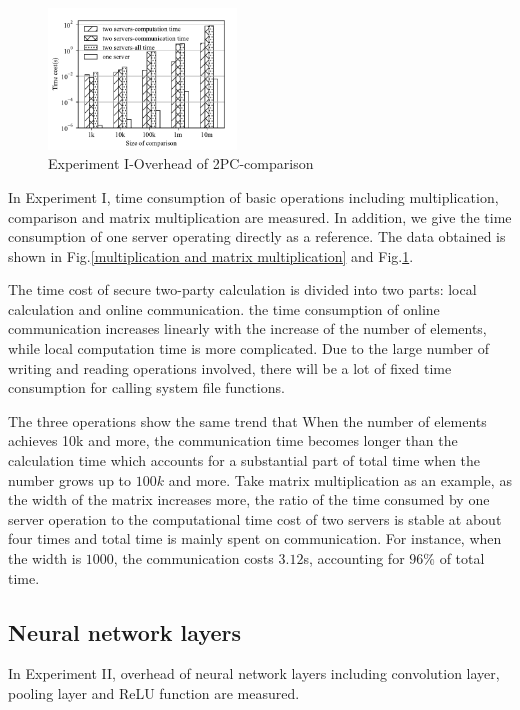 \documentclass[letterpaper]{article} %
\begin{document}
    \begin{figure}[htbp]

        \centering
        \includegraphics[width=5cm]{operation_compare.pdf}
        \caption{Experiment I-Overhead of 2PC-comparison}
        \label{operation_compare}
    \end{figure}
    In Experiment I, time consumption of basic operations including multiplication, comparison and matrix multiplication are measured.
    In addition, we give the time consumption of one server operating directly as a reference.
    The data obtained is shown in Fig.\ref{multiplication and matrix multiplication} and Fig.\ref{operation_compare}. 
    
    The time cost of secure two-party calculation is divided into two parts: 
    local calculation and online communication. 
    the time consumption of online communication increases linearly with the increase of the number of elements, 
    while local computation time is more complicated. 
    Due to the large number of writing and reading operations involved, 
    there will be a lot of fixed time consumption for calling system file functions. 
    
    The three operations show the same trend that 
    When the number of elements achieves 10k and more, 
    the communication time becomes longer than the calculation time 
    which accounts for a substantial part of total time when the number grows up to $100k$ and more.
    Take matrix multiplication as an example, as the width of the matrix increases more, 
    the ratio of the time consumed by one server operation 
    to the computational time cost of two servers is stable at about four times and total time is mainly spent on communication.
    For instance, when the width is $1000$, the communication costs $3.12$s, accounting for $96\%$ of total time.

    \subsection{Neural network layers}
    In Experiment II, overhead of neural network layers including 
    convolution layer, pooling layer and ReLU function are measured.
    
\end{document}
